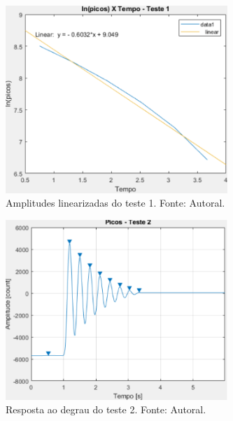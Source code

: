 \documentclass{ifacconf}
\begin{document}
\begin{figure}[!htb]
  \begin{center}
  \includegraphics[width=8.4cm]{figures/regressao_teste_1.png}    %
  \caption{Amplitudes linearizadas do teste 1. Fonte: Autoral.} 
  \label{fig:regressao_teste_1}
  \end{center}
\end{figure}

\begin{figure}[!htb]
  \begin{center}
  \includegraphics[width=8.4cm]{figures/picos_teste_2.png}    %
  \caption{Resposta ao degrau do teste 2. Fonte: Autoral.} 
  \label{fig:picos_teste_2}
  \end{center}
\end{figure}
\end{document}
